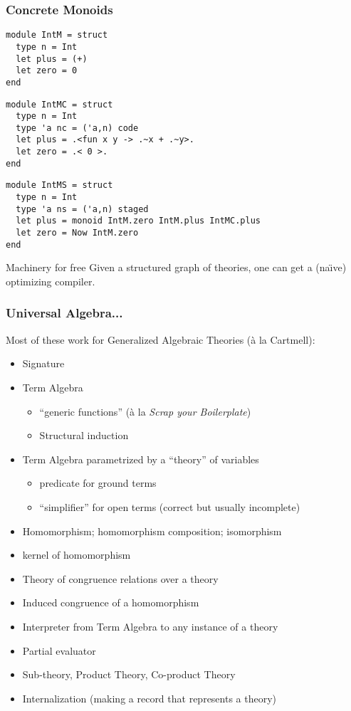 \documentclass{beamer}
\newcommand{\sred}[1]{\textcolor{slidered}{#1}}
\begin{document}
\lstset{language=metaocaml,basicstyle=\scriptsize}
\begin{frame}[t,fragile]
\frametitle{Concrete Monoids}
\begin{minipage}{5.4cm}
\begin{lstlisting}
module IntM = struct
  type n = Int
  let plus = (+)
  let zero = 0
end
\end{lstlisting}
\end{minipage}
\begin{minipage}{5.4cm}
\begin{lstlisting}
module IntMC = struct
  type n = Int
  type 'a nc = ('a,n) code
  let plus = .<fun x y -> .~x + .~y>.
  let zero = .< 0 >.
end
\end{lstlisting}
\end{minipage}
\vspace*{.3cm}
\begin{lstlisting}
module IntMS = struct
  type n = Int
  type 'a ns = ('a,n) staged
  let plus = monoid IntM.zero IntM.plus IntMC.plus
  let zero = Now IntM.zero
end
\end{lstlisting}
\pause
\begin{block}{Machinery for free}
Given a structured graph of theories, one can get a (na\"{\i}ve)
optimizing compiler.
\end{block}
\end{frame}

\begin{frame}
\frametitle{Universal Algebra...}
Most of these work for Generalized Algebraic Theories (\`{a} la Cartmell):
\begin{itemize}
\item Signature
\item Term Algebra
\begin{itemize}
\item ``generic functions'' (\`{a} la \textit{Scrap your Boilerplate})
\item Structural induction
\end{itemize}
\item Term Algebra parametrized by a ``theory'' of variables
\begin{itemize}
\item predicate for ground terms
\item ``simplifier'' for open terms (correct but usually incomplete)
\end{itemize}
\item \sred{Homomorphism}; homomorphism composition; isomorphism
\item kernel of homomorphism
\item Theory of congruence relations over a theory
\item Induced congruence of a homomorphism 
\item Interpreter from Term Algebra to any instance of a theory
\item Partial evaluator
\item Sub-theory, Product Theory, Co-product Theory
\item Internalization (making a record that represents a theory)
\end{itemize}
\end{frame}
\end{document}
